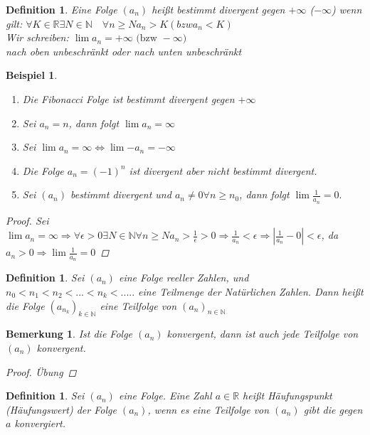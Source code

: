 \documentclass[a4paper,titlepage,oneside]{article}
\def\N{\ensuremath{\mathbb{N}} }
\def\R{\ensuremath{\mathbb{R}} }
\newcommand{\abs}[1]{\ensuremath{\left|#1\right|}}
\theoremstyle{thmstyle}
\newtheorem{defi}[satz]{Definition}
\newtheorem{bsp}[satz]{Beispiel}
\newtheorem{bem}[satz]{Bemerkung}
\begin{document}
\begin{defi}
Eine Folge $(a_n)$ heißt bestimmt divergent gegen $+ \infty $ ($- \infty$) wenn gilt:
$\forall K \in \R \exists N \in \N \quad \forall n \ge N a_n > K (bzw a_n < K)$\\
Wir schreiben: $\lim{a_n} = +\infty \text{ (bzw }-\infty)$\\
nach oben unbeschränkt oder nach unten unbeschränkt
\end{defi}

\begin{bsp}
\begin{enumerate}
\item Die Fibonacci Folge ist bestimmt divergent gegen $+ \infty$
\item Sei $a_n = n$, dann folgt $\lim{a_n} = \infty$
\item Sei $\lim{a_n} = \infty \Leftrightarrow \lim{-a_n} = - \infty$
\item Die Folge $a_n = (-1)^n$ ist divergent aber nicht bestimmt divergent.
\item Sei $(a_n)$ bestimmt divergent und $a_n \ne 0 \forall n \ge n_0$, dann folgt $\lim{\frac{1}{a_n}} = 0.$
\end{enumerate}
\begin{proof}
Sei $\lim{a_n} = \infty \Rightarrow \forall \epsilon > 0 \exists N \in \N \forall n \ge N
a_n > \frac{1}{\epsilon} > 0 \Rightarrow \frac{1}{a_n} < \epsilon \Rightarrow \abs{\frac{1}{a_n} - 0} < \epsilon$, da $a_n > 0 \Rightarrow \lim{\frac{1}{a_n}} = 0$
\end{proof}
\end{bsp}


\begin{defi}
Sei $(a_n)$ eine Folge reeller Zahlen, und $n_0 < n_1 < n_2 <... < n_k < .....$ eine Teilmenge der Natürlichen Zahlen.
Dann heißt die Folge $(a_{n_k})_{k\in\N}$ eine Teilfolge von $(a_n)_{n\in\N}$
\end{defi}

\begin{bem}
Ist die Folge $(a_n)$ konvergent, dann ist auch jede Teilfolge von $(a_n)$ konvergent.
\begin{proof} Übung
\end{proof}
\end{bem}

\begin{defi}
Sei $(a_n)$ eine Folge. Eine Zahl $a \in \R$ heißt Häufungspunkt (Häufungswert) der Folge $(a_n)$, wenn es eine Teilfolge von $(a_n)$ gibt die gegen $a$ konvergiert.
\end{defi}
\end{document}
